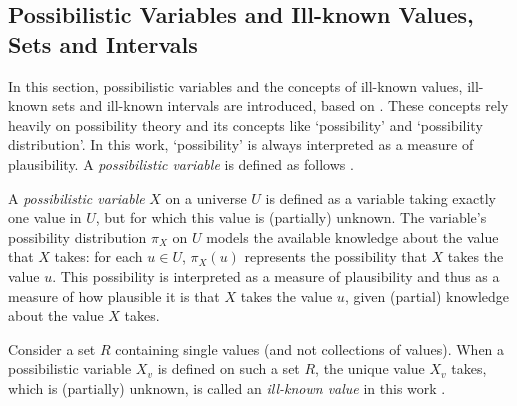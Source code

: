 




\subsection{\label{subsec:possibilistic-variables}Possibilistic Variables and Ill-known Values, Sets and Intervals}
In this section, possibilistic variables and the concepts of ill-known values, ill-known sets and ill-known intervals are introduced, based on \cite{Pon11}. These concepts rely heavily on possibility theory \cite{Dubois:Prade:1988:PossibilityTheory} and its concepts like `possibility' and `possibility distribution'. In this work, `possibility' is always interpreted as a measure of plausibility. A \emph{possibilistic variable} is defined as follows \cite{Pon11}.


\begin{definition}
A \emph{possibilistic variable} $X$ on a universe $U$ is defined as a variable taking exactly one value in $U$, but for which this value is (partially) unknown. The variable's possibility distribution $\pi_X$ on $U$ models the available knowledge about the value that $X$ takes: for each $u \in U$, $\pi_X(u)$ represents the possibility that $X$ takes the value $u$. This possibility is interpreted as a measure of plausibility and thus as a measure of how plausible it is that $X$ takes the value $u$, given (partial) knowledge about the value $X$ takes.
\end{definition}
Consider a set $R$ containing single values (and not collections of values). When a possibilistic variable $X_{v}$ is defined on such a set $R$, the unique value $X_{v}$ takes, which is (partially) unknown, is called an \emph{ill-known value} in this work \cite{Dubois88b}.

